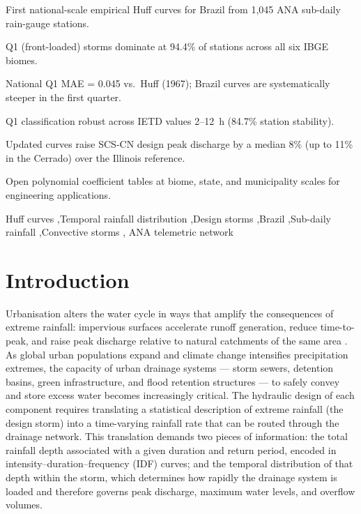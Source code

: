 \documentclass[a4paper,fleqn]{cas-sc}
\begin{document}
\begin{highlights}
\item First national-scale empirical Huff curves for Brazil from
      1,045 ANA sub-daily rain-gauge stations.
\item Q1 (front-loaded) storms dominate at 94.4\% of stations
      across all six IBGE biomes.
\item National Q1 MAE = 0.045 vs.\ Huff (1967); Brazil curves are
      systematically steeper in the first quarter.
\item Q1 classification robust across IETD values 2–12~h
      (84.7\% station stability).
\item Updated curves raise SCS-CN design peak discharge by a median
      8\% (up to 11\% in the Cerrado) over the Illinois reference.
\item Open polynomial coefficient tables at biome, state, and
      municipality scales for engineering applications.
\end{highlights}

\begin{keywords}
Huff curves \sep Temporal rainfall distribution \sep Design storms
\sep Brazil \sep Sub-daily rainfall \sep Convective storms \sep
ANA telemetric network
\end{keywords}

\section{Introduction}
\label{sec:intro}

Urbanisation alters the water cycle in ways that amplify the
consequences of extreme rainfall: impervious surfaces accelerate
runoff generation, reduce time-to-peak, and raise peak discharge
relative to natural catchments of the same area
\citep{Marengo2012, Zipser2006}. As global urban populations expand
and climate change intensifies precipitation extremes, the capacity
of urban drainage systems — storm sewers, detention basins, green
infrastructure, and flood retention structures — to safely convey
and store excess water becomes increasingly critical. The hydraulic
design of each component requires translating a statistical description
of extreme rainfall (the design storm) into a time-varying rainfall
rate that can be routed through the drainage network. This
translation demands two pieces of information: the total rainfall
depth associated with a given duration and return period, encoded in
intensity–duration–frequency (IDF) curves; and the temporal distribution
of that depth within the storm, which determines how rapidly the
drainage system is loaded and therefore governs peak discharge, maximum
water levels, and overflow volumes.
\end{document}
